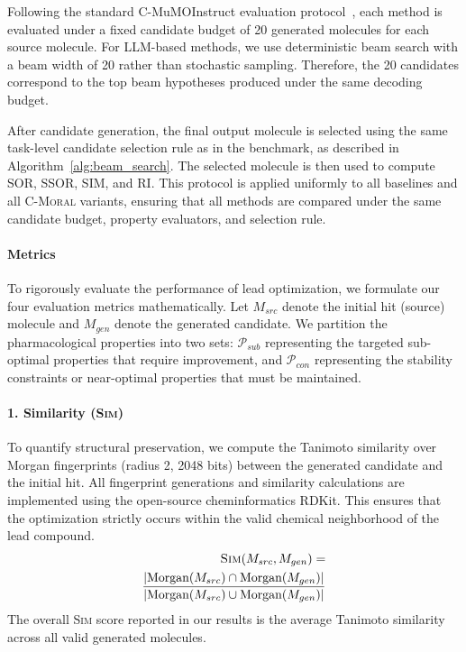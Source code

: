 \documentclass[11pt]{article}
\begin{document}
\label{appendix:generation}
Following the standard C-MuMOInstruct evaluation protocol~\cite{dey2025large}, each method is evaluated under a fixed candidate budget of 20 generated molecules for each source molecule. For LLM-based methods, we use deterministic beam search with a beam width of 20 rather than stochastic sampling. Therefore, the 20 candidates correspond to the top beam hypotheses produced under the same decoding budget.

After candidate generation, the final output molecule is selected using the same task-level candidate selection rule as in the benchmark, as described in Algorithm~\ref{alg:beam_search}. The selected molecule is then used to compute SOR, SSOR, SIM, and RI. This protocol is applied uniformly to all baselines and all \textsc{C-Moral} variants, ensuring that all methods are compared under the same candidate budget, property evaluators, and selection rule.

\paragraph{Metrics}
To rigorously evaluate the performance of lead optimization, we formulate our four evaluation metrics mathematically. Let $M_{src}$ denote the initial hit (source) molecule and $M_{gen}$ denote the generated candidate. We partition the pharmacological properties into two sets: $\mathcal{P}_{sub}$ representing the targeted sub-optimal properties that require improvement, and $\mathcal{P}_{con}$ representing the stability constraints or near-optimal properties that must be maintained.

\paragraph{1. Similarity (\textsc{Sim})}
To quantify structural preservation, we compute the Tanimoto similarity over Morgan fingerprints (radius 2, 2048 bits) between the generated candidate and the initial hit. All fingerprint generations and similarity calculations are implemented using the open-source cheminformatics RDKit. This ensures that the optimization strictly occurs within the valid chemical neighborhood of the lead compound. 
\[
\begin{aligned}
    \textsc{Sim}(M_{src}, M_{gen}) = & \\
    \frac{|\text{Morgan}(M_{src}) \cap \text{Morgan}(M_{gen})|}{|\text{Morgan}(M_{src}) \cup \text{Morgan}(M_{gen})|}
\end{aligned}
\]
The overall \textsc{Sim} score reported in our results is the average Tanimoto similarity across all valid generated molecules.
\end{document}
